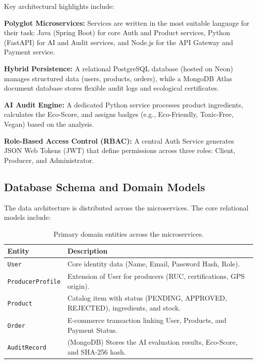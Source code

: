 \documentclass[preprint,12pt,a4paper]{elsarticle}
\begin{document}
Key architectural highlights include:

\textbf{Polyglot Microservices:} Services are written in the most suitable language for their task: Java (Spring Boot) for core Auth and Product services, Python (FastAPI) for AI and Audit services, and Node.js for the API Gateway and Payment service.

\textbf{Hybrid Persistence:} A relational PostgreSQL database (hosted on Neon) manages structured data (users, products, orders), while a MongoDB Atlas document database stores flexible audit logs and ecological certificates.

\textbf{AI Audit Engine:} A dedicated Python service processes product ingredients, calculates the Eco-Score, and assigns badges (e.g., Eco-Friendly, Toxic-Free, Vegan) based on the analysis.

\textbf{Role-Based Access Control (RBAC):} A central Auth Service generates JSON Web Tokens (JWT) that define permissions across three roles: Client, Producer, and Administrator.

\subsection{Database Schema and Domain Models}

The data architecture is distributed across the microservices. The core relational models include:

\begin{table}[!h]
\centering
\begin{tabular}{lp{9.5cm}}
\toprule
\textbf{Entity} & \textbf{Description} \\
\midrule
\texttt{User}            & Core identity data (Name, Email, Password Hash, Role). \\
\texttt{ProducerProfile} & Extension of User for producers (RUC, certifications, GPS origin). \\
\texttt{Product}         & Catalog item with status (PENDING, APPROVED, REJECTED), ingredients, and stock. \\
\texttt{Order}           & E-commerce transaction linking User, Products, and Payment Status. \\
\texttt{AuditRecord}     & (MongoDB) Stores the AI evaluation results, Eco-Score, and SHA-256 hash. \\
\bottomrule
\end{tabular}
\caption{Primary domain entities across the microservices.}
\label{tab:schema}
\end{table}
\end{document}
